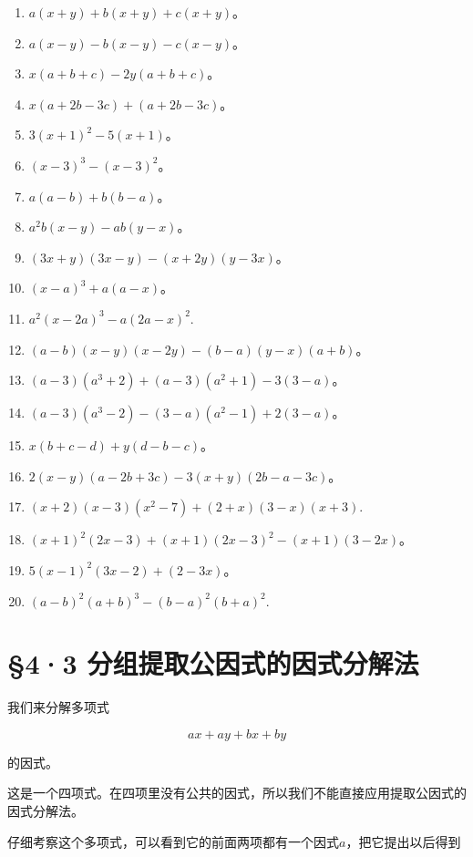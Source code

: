 \begin{enumerate}[start=1]
\item
  \(a(x + y) + b(x + y) + c(x + y)\)。
\item
  \(a(x - y) - b(x - y) - c(x - y)\)。
\item
  \(x(a + b + c) - 2y(a + b + c)\)。
\item
  \(x(a + 2b - 3c) + (a + 2b - 3c)\)。
\item
  \(3(x + 1)^{2} - 5(x + 1)\)。
\item
  \((x - 3)^{3} - (x - 3)^{2}\)。
\item
  \(a(a - b) + b(b - a)\)。
\item
  \(a^2 b(x - y) - ab(y - x)\)。
\item
  \((3x + y)(3x - y) - (x + 2y)(y - 3x)\)。
\item
  \((x - a)^{3} + a(a - x)\)。
\item
  \(a^2 (x - 2a)^3 -a(2a - x)^2.\)
\item
  \((a - b)(x - y)(x - 2y) - (b - a)(y - x)(a + b)\)。
\item
  \((a - 3)(a^3 + 2) + (a - 3)(a^2 + 1) - 3(3 - a)\)。
\item
  \((a - 3)(a^3 - 2) - (3 - a)(a^2 - 1) + 2(3 - a)\)。
\item
  \(x(b + c - d) + y(d - b - c)\)。
\item
  \(2(x - y)(a - 2b + 3c) - 3(x + y)(2b - a - 3c)\)。
\item
  \((x + 2)(x - 3)(x^2 -7) + (2 + x)(3 - x)(x + 3).\)
\item
  \((x + 1)^{2}(2x - 3) + (x + 1)(2x - 3)^{2} - (x + 1)(3 - 2x)\)。
\item
  \(5(x - 1)^{2}(3x - 2) + (2 - 3x)\)。
\item
  \((a - b)^2 (a + b)^3 -(b - a)^2 (b + a)^2.\)
\end{enumerate}

\section{§4·3 分组提取公因式的因式分解法}

我们来分解多项式

\[
a x + a y + b x + b y
\]

的因式。

这是一个四项式。在四项里没有公共的因式，所以我们不能直接应用提取公因式的因式分解法。

仔细考察这个多项式，可以看到它的前面两项都有一个因式\(a\)，把它提出以后得到

